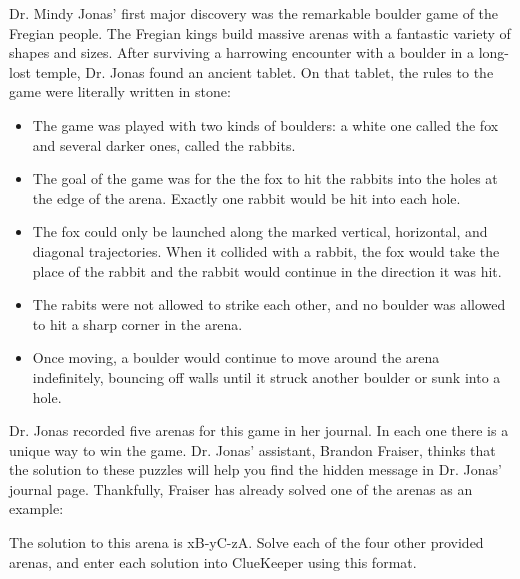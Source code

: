 Dr. Mindy Jonas' first major discovery was the remarkable boulder game of the Fregian people. The Fregian kings build massive arenas with a fantastic variety of shapes and sizes. After surviving a harrowing encounter with a boulder in a long-lost temple, Dr. Jonas found an ancient tablet. On that tablet, the rules to the game were literally written in stone:
\begin{itemize}
        \item The game was played with two kinds of boulders: a white one called the fox and several darker ones, called the rabbits.
        \item The goal of the game was for the the fox to hit the rabbits into the holes at the edge of the arena. Exactly one rabbit would be hit into each hole.
        \item The fox could only be launched along the marked vertical, horizontal, and diagonal trajectories. When it collided with a rabbit, the fox would take the place of the rabbit and the rabbit would continue in the direction it was hit.
        \item The rabits were not allowed to strike each other, and no boulder was allowed to hit a sharp corner in the arena.
        \item Once moving, a boulder would continue to move around the arena indefinitely, bouncing off walls until it struck another boulder or sunk into a hole.
\end{itemize}

Dr. Jonas recorded five arenas for this game in her journal. In each one there is a unique way to win the game. Dr. Jonas' assistant, Brandon Fraiser, thinks that the solution to these puzzles will help you find the hidden message in Dr. Jonas' journal page. Thankfully, Fraiser has already solved one of the arenas as an example:



The solution to this arena is xB-yC-zA. Solve each of the four other provided arenas, and enter each solution into ClueKeeper using this format.